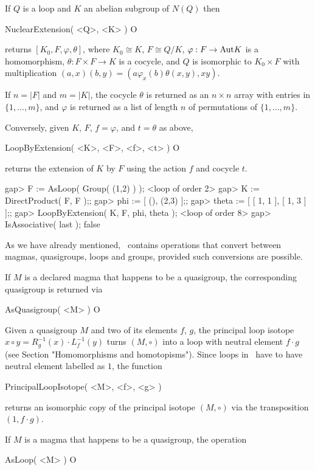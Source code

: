 If $Q$ is a loop and $K$ an abelian subgroup of $N(Q)$ then

\>NuclearExtension( <Q>, <K> ) O

returns $[K_0, F, \varphi, \theta]$, where $K_0\cong K$, $F\cong Q/K$,
$\varphi:F\to{\rm{Aut}}{K}$ is a homomorphism, $\theta:F\times F\to K$ is a
cocycle, and $Q$ is isomorphic to $K_0\times F$ with multiplication $(a,x)(b,y)
= (a\varphi_x(b)\theta(x,y),xy)$.

If $n=|F|$ and $m=|K|$, the cocycle $\theta$ is returned as an $n\times n$
array with entries in $\{1,\dots,m\}$, and $\varphi$ is returned as a list of
length $n$ of permutations of $\{1,\dots,m\}$.

Conversely, given $K$, $F$, $f = \varphi$, and $t = \theta$ as above,

\>LoopByExtension( <K>, <F>, <f>, <t> ) O

returns the extension of $K$ by $F$ using the action $f$ and cocycle $t$.

\beginexample
gap> F := AsLoop( Group( (1,2) ) );
<loop of order 2>
gap> K := DirectProduct( F, F );;
gap> phi := [ (), (2,3) ];;
gap> theta := [ [ 1, 1 ], [ 1, 3 ] ];;
gap> LoopByExtension( K, F, phi, theta );
<loop of order 8>
gap> IsAssociative( last );
false
\endexample


As we have already mentioned, \LOOPS\ contains operations that convert
between magmas, quasigroups, loops and groups, provided such conversions are
possible.

If $M$ is a declared magma that happens to be a quasigroup, the corresponding
quasigroup is returned via

\>AsQuasigroup( <M> ) O

Given a quasigroup $M$ and two of its elements $f$, $g$, the principal loop
isotope $x\circ y = R_g^{-1}(x)\cdot L_f^{-1}(y)$ turns $(M,\circ)$ into a loop
with neutral element $f\cdot g$ (see Section "Homomorphisms and homotopisms").
Since loops in \LOOPS\ have to have neutral element labelled as $1$, the
function

\>PrincipalLoopIsotope( <M>, <f>, <g> )

returns an isomorphic copy of the principal isotope $(M,\circ)$ via the
transposition $(1,f\cdot g)$.

If $M$ is a magma that happens to be a quasigroup, the operation

\>AsLoop( <M> ) O

